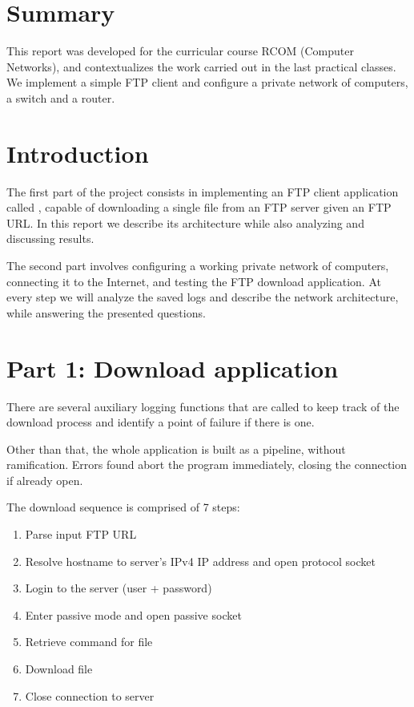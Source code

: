 \documentclass[compilation.tex]{subfiles}
\begin{document}
\section{Summary}
\label{sec:summary}

This report was developed for the curricular course RCOM (Computer Networks), and contextualizes the work carried out in the last practical classes. We implement a simple FTP client and configure a private network of computers, a switch and a router.

\section{Introduction}
\label{sec:introduction}

The first part of the project consists in implementing an FTP client application called , capable of downloading a single file from an FTP server given an FTP URL.
In this report we describe its architecture while also analyzing and discussing results.

The second part involves configuring a working private network of computers, connecting it to the Internet, and testing the FTP download application. At every step we will analyze the saved logs and describe the network architecture, while answering the presented questions.

\section{Part 1: Download application}
\label{sec:downloadapp}

There are several auxiliary logging functions that are called to keep track of the download process and identify a point of failure if there is one.

Other than that, the whole application is built as a pipeline, without ramification. Errors found abort the program immediately, closing the connection if already open.

The download sequence is comprised of 7 steps:

\begin{enumerate}[noitemsep]
\item Parse input FTP URL
\item Resolve hostname to server's IPv4 IP address and open protocol socket
\item Login to the server (user + password)
\item Enter passive mode and open passive socket
\item Retrieve command for file
\item Download file
\item Close connection to server
\end{enumerate}
\end{document}
